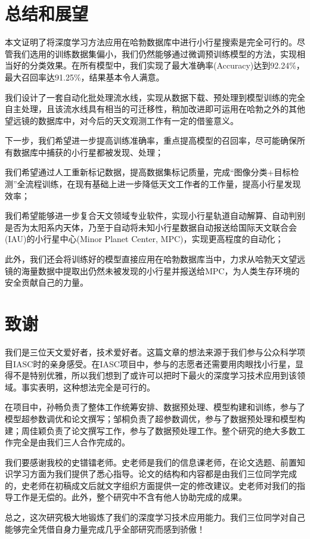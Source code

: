 \documentclass[12pt,a4paper]{article}%
\begin{document}
\section{总结和展望}

本文证明了将深度学习方法应用在哈勃数据库中进行小行星搜索是完全可行的。尽管我们选用的训练数据集偏小，我们仍然能够通过微调预训练模型的方法，实现相当好的分类效果。在所有模型中，我们实现了最大准确率(Accuracy)达到92.24\%，最大召回率达91.25\%，结果基本令人满意。

我们设计了一套自动化批处理流水线，实现从数据下载、预处理到模型训练的完全自主处理，且该流水线具有相当的可迁移性，稍加改进即可运用在哈勃之外的其他望远镜的数据库中，对今后的天文观测工作有一定的借鉴意义。

下一步，我们希望进一步提高训练准确率，重点提高模型的召回率，尽可能确保所有数据库中捕获的小行星都被发现、处理；

我们希望通过人工重新标记数据，提高数据集标记质量，完成“图像分类+目标检测”全流程训练，在现有基础上进一步降低天文工作者的工作量，提高小行星发现效率；

我们希望能够进一步复合天文领域专业软件，实现小行星轨道自动解算、自动判别是否为太阳系内天体，乃至于自动将未知小行星数据自动报送给国际天文联合会(IAU)的小行星中心(Minor Planet Center, MPC)，实现更高程度的自动化；

此外，我们还会将训练好的模型直接应用在哈勃数据库当中，力求从哈勃天文望远镜的海量数据中提取出仍然未被发现的小行星并报送给MPC，为人类生存环境的安全贡献自己的力量。



\newpage




\newpage

\section*{致谢}

我们是三位天文爱好者，技术爱好者。这篇文章的想法来源于我们参与公众科学项目IASC时的亲身感受。在IASC项目中，参与的志愿者还需要用肉眼找小行星，显得不是特别优雅，所以我们想到了或许可以把时下最火的深度学习技术应用到该领域。事实表明，这种想法完全是可行的。

在项目中，孙畅负责了整体工作统筹安排、数据预处理、模型构建和训练，参与了模型超参数调优和论文撰写；邹桐负责了超参数调优，参与了数据预处理和模型构建；周佳颖负责了论文撰写工作，参与了数据预处理工作。整个研究的绝大多数工作完全是由我们三人合作完成的。

我们要感谢我校的史镨镭老师。史老师是我们的信息课老师，在论文选题、前置知识学习方面为我们提供了悉心指导。论文的结构和内容都是由我们三位同学完成的，史老师在初稿成文后就文字组织方面提供一定的修改建议。史老师对我们的指导工作是无偿的。此外，整个研究中不含有他人协助完成的成果。

总之，这次研究极大地锻炼了我们的深度学习技术应用能力。我们三位同学对自己能够完全凭借自身力量完成几乎全部研究而感到骄傲！
\end{document}
